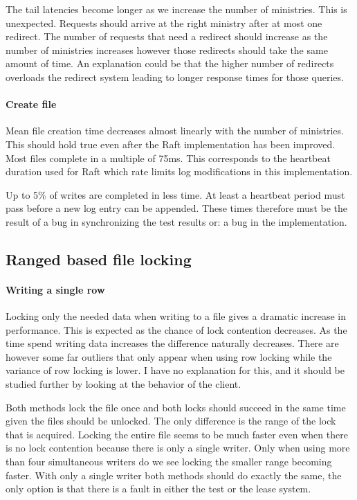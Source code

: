 The tail latencies become longer as we increase the number of ministries. This is unexpected. Requests should arrive at the right ministry after at most one redirect. The number of requests that need a redirect should increase as the number of ministries increases however those redirects should take the same amount of time. An explanation could be that the higher number of redirects overloads the redirect system leading to longer response times for those queries.
%
\paragraph{Create file} 
Mean file creation time decreases almost linearly with the number of ministries. This should hold true even after the Raft implementation has been improved. Most files complete in a multiple of 75ms. This corresponds to the heartbeat duration used for Raft which rate limits log modifications in this implementation. 

Up to 5\% of writes are completed in less time. At least a heartbeat period must pass before a new log entry can be appended. These times therefore must be the result of a bug in synchronizing the test results or: a bug in the implementation.
%
\subsection{Ranged based file locking}
\paragraph{Writing a single row}
Locking only the needed data when writing to a file gives a dramatic increase in performance. This is expected as the chance of lock contention decreases. As the time spend writing data increases the difference naturally decreases. There are however some far outliers that only appear when using row locking while the variance of row locking is lower. I have no explanation for this, and it should be studied further by looking at the behavior of the client.

Both methods lock the file once and both locks should succeed in the same time given the files should be unlocked. The only difference is the range of the lock that is acquired. Locking the entire file seems to be much faster even when there is no lock contention because there is only a single writer. Only when using more than four simultaneous writers do we see locking the smaller range becoming faster. With only a single writer both methods should do exactly the same, the only option is that there is a fault in either the test or the lease system.
%
